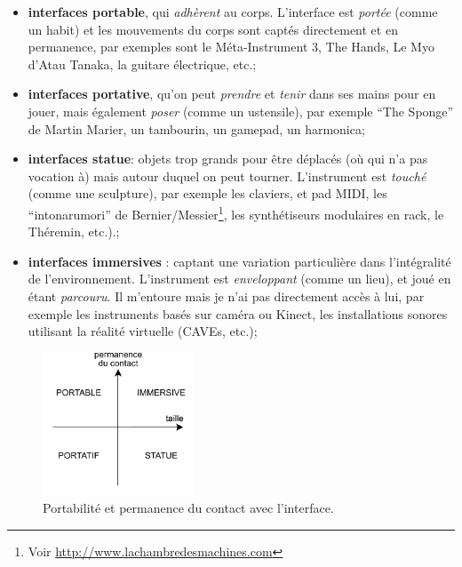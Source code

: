 \vspace{-1em}
\begin{itemize}[noitemsep]
	\item \textbf{interfaces portable}, qui \textit{adhèrent} au corps. L'interface est \textit{portée} (comme un habit) et les mouvements du corps sont captés directement et en permanence, par exemples sont le Méta-Instrument 3, The Hands, Le Myo d'Atau Tanaka, la guitare électrique, etc.;
	\item \textbf{interfaces portative}, qu'on peut \textit{prendre} et \textit{tenir} dans ses mains pour en jouer, mais également \textit{poser} (comme un ustensile), par exemple ``The Sponge'' de Martin Marier, un tambourin, un gamepad, un harmonica;
	\item \textbf{interfaces statue}: objets trop grands pour être déplacés (où qui n'a pas vocation à) mais autour duquel on peut tourner. L'instrument est \textit{touché} (comme une sculpture), par exemple les claviers, et pad \gls{MIDI}, les ``intonarumori'' de Bernier/Messier\footnote{Voir \url{http://www.lachambredesmachines.com}}, les synthétiseurs modulaires en rack, le Théremin, etc.).;
	\item \textbf{interfaces immersives} : captant une variation particulière dans l'intégralité de l'environnement. L'instrument est \textit{enveloppant} (comme un lieu), et joué en étant \textit{parcouru}. Il m'entoure mais je n'ai pas directement accès à lui, par exemple les instruments basés sur caméra ou Kinect, les installations sonores utilisant la réalité virtuelle (CAVEs, etc.);
\end{itemize}
\begin{figure}
	\vspace{-1em}
	\captionsetup{format=plain}
	\centering
 	\includegraphics[width=0.4\textwidth]{gfx/05_interfaces/interface-portabilite.pdf}
	\caption[Portabilité et permanence du contact avec l'interface.]{Portabilité et permanence du contact avec l'interface.}
 	\label{fig:interfaces:portabilite}
\end{figure}
